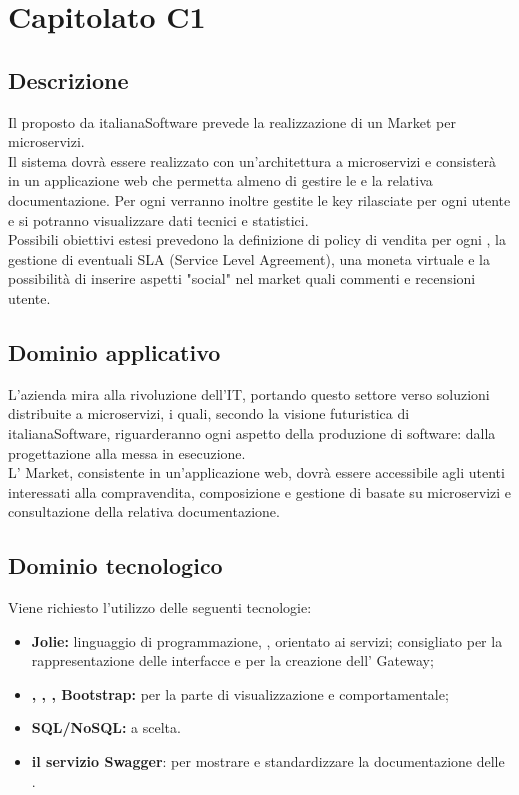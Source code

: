 
\section {Capitolato C1}

\subsection {Descrizione}
Il  proposto da italianaSoftware prevede la realizzazione di un  Market per microservizi.\\
Il sistema dovrà essere realizzato con un'architettura a microservizi e consisterà in un applicazione web che permetta almeno di gestire le  e la relativa documentazione. Per ogni  verranno inoltre gestite le  key rilasciate per ogni utente e si potranno visualizzare dati tecnici e statistici. \\
Possibili obiettivi estesi prevedono la definizione di policy di vendita per ogni , la gestione di eventuali SLA (Service Level Agreement), una moneta virtuale e la possibilità di inserire aspetti "social" nel market quali commenti e recensioni utente.


\subsection {Dominio applicativo}
L'azienda mira alla rivoluzione dell'IT, portando questo settore verso soluzioni distribuite a microservizi, i quali, secondo la visione futuristica di italianaSoftware, riguarderanno ogni aspetto della produzione di software: dalla progettazione alla messa in esecuzione.\\
L' Market, consistente in un'applicazione web, dovrà essere accessibile agli utenti interessati alla compravendita, composizione e gestione di  basate su microservizi e consultazione della relativa documentazione.\\


\subsection {Dominio tecnologico}
Viene richiesto l’utilizzo delle seguenti tecnologie:
\begin{itemize}
	\item \textbf{Jolie:} linguaggio di programmazione, , orientato ai servizi; consigliato per la rappresentazione delle interfacce e per la creazione dell' Gateway;
	\item \textbf{, , , Bootstrap:} per la parte di visualizzazione e comportamentale;
	\item \textbf{ SQL/NoSQL:} a scelta.
	\item \textbf{il servizio Swagger}: per mostrare e standardizzare la documentazione delle .
\end{itemize}


